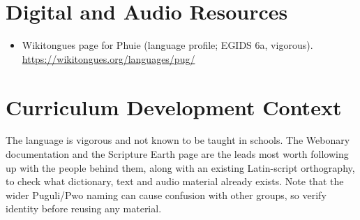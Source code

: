 \documentclass[12pt]{article}
\begin{document}
\section{Digital and Audio Resources}
\begin{itemize}
\item Wikitongues page for Phuie (language profile; EGIDS 6a, vigorous). \url{https://wikitongues.org/languages/pug/}
\end{itemize}

\section{Curriculum Development Context}
The language is vigorous and not known to be taught in schools. The Webonary documentation and the Scripture Earth page are the leads most worth following up with the people behind them, along with an existing Latin-script orthography, to check what dictionary, text and audio material already exists. Note that the wider Puguli/Pwo naming can cause confusion with other groups, so verify identity before reusing any material.
\end{document}
